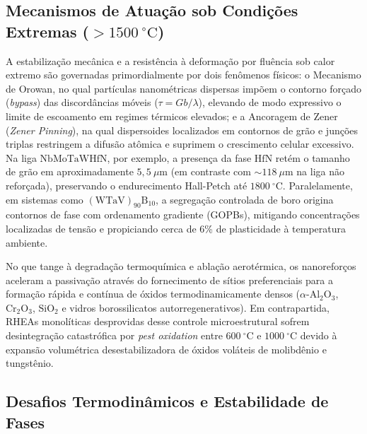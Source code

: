 \subsection{Mecanismos de Atuação sob Condições Extremas ($> 1500~^\circ\mathrm{C}$)}\label{subsec:mecanismos_atuacao_extremas}

A estabilização mecânica e a resistência à deformação por fluência sob calor extremo são governadas primordialmente por dois fenômenos físicos: o Mecanismo de Orowan, no qual partículas nanométricas dispersas impõem o contorno forçado (\emph{bypass}) das discordâncias móveis ($\tau = Gb/\lambda$), elevando de modo expressivo o limite de escoamento em regimes térmicos elevados; e a Ancoragem de Zener (\emph{Zener Pinning}), na qual dispersoides localizados em contornos de grão e junções triplas restringem a difusão atômica e suprimem o crescimento celular excessivo. Na liga $\mathrm{NbMoTaWHfN}$, por exemplo, a presença da fase $\mathrm{HfN}$ retém o tamanho de grão em aproximadamente $5{,}5~\mu\mathrm{m}$ (em contraste com $\sim 118~\mu\mathrm{m}$ na liga não reforçada), preservando o endurecimento Hall-Petch até $1800~^\circ\mathrm{C}$. Paralelamente, em sistemas como $(\mathrm{WTaV})_{90}\mathrm{B}_{10}$, a segregação controlada de boro origina contornos de fase com ordenamento gradiente (GOPBs), mitigando concentrações localizadas de tensão e propiciando cerca de 6\% de plasticidade à temperatura ambiente.

No que tange à degradação termoquímica e ablação aerotérmica, os nanoreforços aceleram a passivação através do fornecimento de sítios preferenciais para a formação rápida e contínua de óxidos termodinamicamente densos ($\alpha\text{-}\mathrm{Al}_2\mathrm{O}_3$, $\mathrm{Cr}_2\mathrm{O}_3$, $\mathrm{SiO}_2$ e vidros borossilicatos autorregenerativos). Em contrapartida, RHEAs monolíticas desprovidas desse controle microestrutural sofrem desintegração catastrófica por \emph{pest oxidation} entre $600~^\circ\mathrm{C}$ e $1000~^\circ\mathrm{C}$ devido à expansão volumétrica desestabilizadora de óxidos voláteis de molibdênio e tungstênio.

\subsection{Desafios Termodinâmicos e Estabilidade de Fases}\label{subsec:desafios_termodinamicos_limitacoes}

